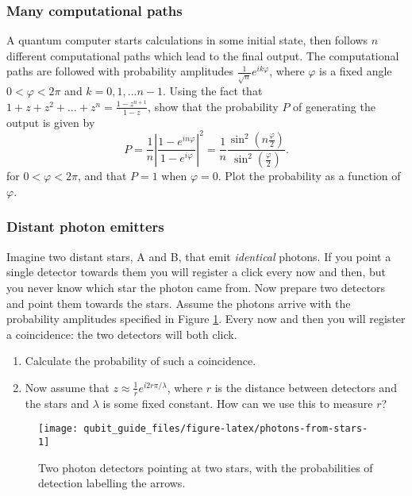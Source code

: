 \documentclass[fleqn]{article}
\providecommand{\tightlist}{%
  \setlength{\itemsep}{0pt}\setlength{\parskip}{0pt}}
\begin{document}
\hypertarget{many-computational-paths}{%
\subsubsection{Many computational paths}\label{many-computational-paths}}

A quantum computer starts calculations in some initial state, then follows \(n\) different computational paths which lead to the final output.
The computational paths are followed with probability amplitudes \(\frac{1}{\sqrt n}e^{i k \varphi}\), where \(\varphi\) is a fixed angle \(0< \varphi <2\pi\) and \(k=0,1,...n-1\).
Using the fact that \(1+z+z^2+\ldots + z^n= \frac{1-z^{n+1}}{1-z}\), show that the probability \(P\) of generating the output is given by
\[
  P
  = \frac{1}{n}\left\vert
    \frac{1-e^{i n\varphi}}{1-e^{i\varphi}}
  \right\vert^2
  = \frac{1}{n} \frac{\sin^2 (n\frac{\varphi}{2})}{\sin^2 (\frac{\varphi}{2})}.
\]
for \(0<\varphi<2\pi\), and that \(P=1\) when \(\varphi=0\).
Plot the probability as a function of \(\varphi\).

\hypertarget{distant-photon-emitters}{%
\subsubsection{Distant photon emitters}\label{distant-photon-emitters}}

Imagine two distant stars, A and B, that emit \emph{identical} photons.
If you point a single detector towards them you will register a click every now and then, but you never know which star the photon came from.
Now prepare two detectors and point them towards the stars.
Assume the photons arrive with the probability amplitudes specified in Figure \ref{fig:photons-from-stars}.
Every now and then you will register a coincidence: the two detectors will both click.

\begin{enumerate}
\def\labelenumi{\alph{enumi}.}
\tightlist
\item
  Calculate the probability of such a coincidence.
\item
  Now assume that \(z\approx \frac{1}{r}e^{i{2r\pi}/{\lambda}}\), where \(r\) is the distance between detectors and the stars and \(\lambda\) is some fixed constant. How can we use this to measure \(r\)?
\end{enumerate}

\begin{figure}[H]

{\centering \texttt{[image: qubit\_guide\_files/figure-latex/photons-from-stars-1]} 

}

\caption{Two photon detectors pointing at two stars, with the probabilities of detection labelling the arrows.}\label{fig:photons-from-stars}
\end{figure}
\end{document}
